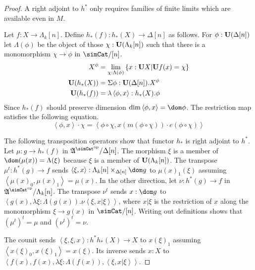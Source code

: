 \documentclass{tac}
\newcommand\set[1]{\left\{#1\right\}}
\newcommand\ri{^*}
\newcommand\dual{^{\mathrm{op}}}
\newcommand\s{^{\simCat\dual}}
\newcommand\of{:}
\newcommand\simplex\Delta
\newcommand\horn\Lambda
\newcommand\tuplet[1]{\left\langle #1 \right\rangle}
\newcommand\ambient{\mathfrak A}
\begin{document}
\newcommand\subs\Lambda
\begin{proof} 
A right adjoint to $h\ri$ only requires families of finite limits which are available even in $M$.

Let $f\of X\to \horn_k[n]$. Define $h_*(f)\of h_*(X)\to \simplex[n]$ as follows. For $\phi\of\base(\simplex[n])$ let $\subs(\phi)$ be the object of those $\chi\of \base(\horn_k[n])$ such that there is a monomorphism $\chi\to \phi$ in $\simCat/[n]$. 
\begin{align*}
X^\phi &= \lim\limits_{\chi\of \subs(\phi)} \set{ x\of \base X | \base f(x) = \chi }\\
\base(h_*(X)) &= \Sigma \phi\of\base(\simplex[n]). X^\phi\\
\base(h_*(f)) &= \lambda\tuplet{\phi,x}\of h_*(X).\phi
\end{align*}
Since $h_*(f)$ should preserve dimension $\dim\tuplet{\phi,x}=\dom\phi$. The restriction map satisfies the following equation.
\[ \tuplet{\phi,x}\cdot\chi = \tuplet{\phi\circ\chi,x(m(\phi\circ\chi))\cdot e(\phi\circ\chi)}\]

The following transposition operators show that functor $h_*$ is right adjoint to $h\ri$.
Let $\mu\of g\to h_*(f)$ in $\ambient\s/\simplex[n]$. The morphism $\xi$ is a member of $\dom(\mu(x)) = \Lambda(\xi)$ because $\xi$ is a member of $\base(\horn_k[n])$. The transpose $\mu^t\of h\ri(g) \to f$ sends $\tuplet{\xi,x}\of \horn_k[n]\times_{\simplex[n]}\dom g$ to $\mu(x)_1(\xi)$ assuming $\tuplet{\mu(x)_0,\mu(x)_1}=\mu(x)$. In the other direction, let $\nu\of h\ri(g)\to f$ in $\ambient\s/\horn_k[n]$. The transpose $\nu^t$ sends $x\of \dom g$ to $\tuplet{g(x),\lambda\xi\of\subs(g(x)).\nu\tuplet{\xi,x|\xi}}$, where $x|\xi$ is the restriction of $x$ along the monomorphism $\xi\to g(x)$ in $\simCat/[n]$. Writing out definitions shows that $(\mu^t)^t=\mu$ and $(\nu^t)^t=\nu$.

The counit sends $\tuplet{\xi,\xi,x} \of h\ri h_*(X)\to X$ to $x(\xi)_1$ assuming $\tuplet{x(\xi)_0,x(\xi)_1}=x(\xi)$. Its inverse sends $x\of X$ to $\tuplet{f(x),f(x),\lambda \xi\of\subs(f(x)),\tuplet{\xi,x|\xi}}$.
\end{proof}

\end{document}
